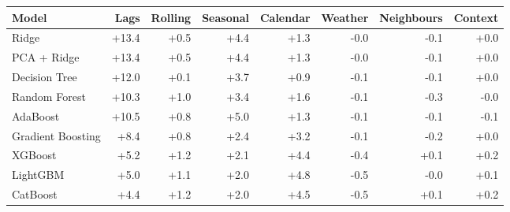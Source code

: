 \begin{tabular}{lrrrrrrr}
\toprule
Model & Lags & Rolling & Seasonal & Calendar & Weather & Neighbours & Context \\
\midrule
Ridge & +13.4 & +0.5 & +4.4 & +1.3 & -0.0 & -0.1 & +0.0 \\
PCA + Ridge & +13.4 & +0.5 & +4.4 & +1.3 & -0.0 & -0.1 & +0.0 \\
Decision Tree & +12.0 & +0.1 & +3.7 & +0.9 & -0.1 & -0.1 & +0.0 \\
Random Forest & +10.3 & +1.0 & +3.4 & +1.6 & -0.1 & -0.3 & -0.0 \\
AdaBoost & +10.5 & +0.8 & +5.0 & +1.3 & -0.1 & -0.1 & -0.1 \\
Gradient Boosting & +8.4 & +0.8 & +2.4 & +3.2 & -0.1 & -0.2 & +0.0 \\
XGBoost & +5.2 & +1.2 & +2.1 & +4.4 & -0.4 & +0.1 & +0.2 \\
LightGBM & +5.0 & +1.1 & +2.0 & +4.8 & -0.5 & -0.0 & +0.1 \\
CatBoost & +4.4 & +1.2 & +2.0 & +4.5 & -0.5 & +0.1 & +0.2 \\
\bottomrule
\end{tabular}
